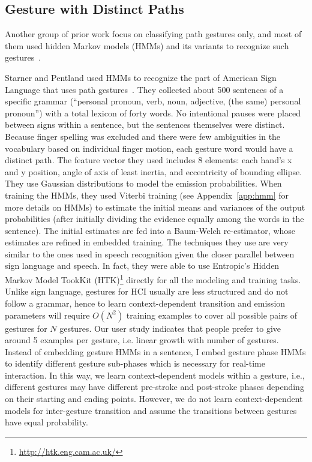 \subsection{Gesture with Distinct Paths}
Another group of prior work focus on classifying path gestures only, and most of
them used hidden Markov models (HMMs) and its variants to recognize such
gestures~\cite{Starner95, sharma00}.

Starner and Pentland used HMMs to recognize the part of American Sign Language
that uses path gestures~\cite{Starner95}. They collected about 500 sentences of a specific grammar (``personal pronoun, verb, noun, adjective, (the same) personal pronoun'') with a total lexicon of
forty words. No intentional pauses were placed between signs within a
sentence, but the sentences themselves were distinct. Because finger spelling
was excluded and there were few ambiguities in the
vocabulary based on individual finger motion, each gesture word would have a
distinct path.
The feature vector they used includes 8 elements:
each hand's x and y position, angle of axis of least inertia, and eccentricity of bounding ellipse.
They use Gaussian distributions to model the emission probabilities.
When training the HMMs, they used Viterbi training (see Appendix~\ref{app:hmm}
for more details on HMMs) to estimate the initial means and variances of the
output probabilities (after initially dividing the evidence equally among the
words in the sentence).
The initial estimates are fed into a Baum-Welch re-estimator, whose estimates are refined in embedded training.
The techniques they use are very similar to the ones used in speech
recognition given the closer parallel between sign language and speech. In fact,
they were able to use Entropic's Hidden Markov Model TookKit (HTK)\footnote{\url{http://htk.eng.cam.ac.uk/}} directly for all
the modeling and training tasks. Unlike
sign language, gestures for HCI usually are less structured and do not follow a
grammar, hence to learn context-dependent transition and emission parameters will require $O(N^2)$
training examples to cover all possible pairs of gestures for
$N$ gestures.
Our user study indicates that people prefer to give around 5 examples per
gesture, i.e. linear growth with number of gestures. Instead of embedding gesture HMMs in a
sentence, I embed gesture phase HMMs to identify different gesture sub-phases
which is necessary for real-time interaction.
In this way, we learn context-dependent models within a gesture, i.e.,
different gestures may have different pre-stroke and post-stroke phases
depending on their starting and ending points. However, we do not learn
context-dependent models for inter-gesture transition and assume the transitions
between gestures have equal probability.


